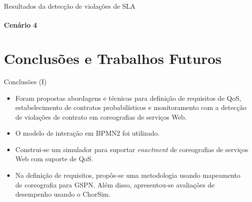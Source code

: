 \documentclass[xcolor=svgnames]{beamer}
\begin{document}
  \begin{frame}{Resultados da detecção de violações de SLA }  
	\framesubtitle{Cenário 4}    
    \end{frame}
    


\section{Conclusões e Trabalhos Futuros}
  \begin{frame}{Conclusões (I)}
      \begin{itemize}
	\item Foram propostas  abordagens e técnicas para definição de requisitos de QoS, estabelecimento de contratos probabilísticos
	e monitoramento com a detecção de violações de contrato em coreografias de serviços Web.
	\item O modelo de interação em BPMN2 foi utilizado.
	\item Construi-se um simulador para suportar \textit{enactment} de coreografias de serviços Web com suporte de QoS.
	\item Na definição de requisitos, propôs-se uma metodologia usando mapeamento de coreografia para GSPN. Além disso, 
	apresentou-se avaliações de desempenho usando o ChorSim.
      \end{itemize}

  \end{frame}
\end{document}
